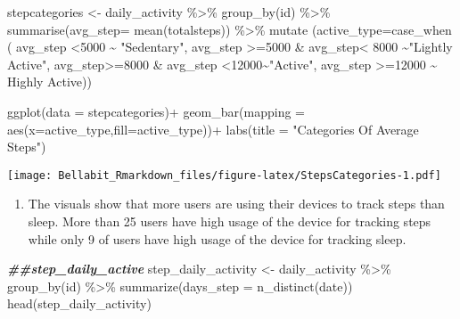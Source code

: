 \documentclass[
]{article}
\newenvironment{Shaded}{\begin{snugshade}}{\end{snugshade}}
\newcommand{\AttributeTok}[1]{\textcolor[rgb]{0.77,0.63,0.00}{#1}}
\newcommand{\DecValTok}[1]{\textcolor[rgb]{0.00,0.00,0.81}{#1}}
\newcommand{\DocumentationTok}[1]{\textcolor[rgb]{0.56,0.35,0.01}{\textbf{\textit{#1}}}}
\newcommand{\FunctionTok}[1]{\textcolor[rgb]{0.00,0.00,0.00}{#1}}
\newcommand{\NormalTok}[1]{#1}
\newcommand{\OtherTok}[1]{\textcolor[rgb]{0.56,0.35,0.01}{#1}}
\newcommand{\SpecialCharTok}[1]{\textcolor[rgb]{0.00,0.00,0.00}{#1}}
\newcommand{\StringTok}[1]{\textcolor[rgb]{0.31,0.60,0.02}{#1}}
\providecommand{\tightlist}{%
  \setlength{\itemsep}{0pt}\setlength{\parskip}{0pt}}
\begin{document}
\begin{Shaded}
\begin{Highlighting}[]
\NormalTok{stepcategories }\OtherTok{\textless{}{-}}\NormalTok{ daily\_activity }\SpecialCharTok{\%\textgreater{}\%} 
  \FunctionTok{group\_by}\NormalTok{(id) }\SpecialCharTok{\%\textgreater{}\%} 
  \FunctionTok{summarise}\NormalTok{(}\AttributeTok{avg\_step=} \FunctionTok{mean}\NormalTok{(totalsteps)) }\SpecialCharTok{\%\textgreater{}\%} 
  \FunctionTok{mutate}\NormalTok{ (}\AttributeTok{active\_type=}\FunctionTok{case\_when}\NormalTok{ (}
\NormalTok{    avg\_step }\SpecialCharTok{\textless{}}\DecValTok{5000} \SpecialCharTok{\textasciitilde{}} \StringTok{"Sedentary"}\NormalTok{,}
\NormalTok{    avg\_step }\SpecialCharTok{\textgreater{}=}\DecValTok{5000} \SpecialCharTok{\&}\NormalTok{ avg\_step}\SpecialCharTok{\textless{}} \DecValTok{8000} \SpecialCharTok{\textasciitilde{}}\StringTok{"Lightly Active"}\NormalTok{,}
\NormalTok{    avg\_step}\SpecialCharTok{\textgreater{}=}\DecValTok{8000} \SpecialCharTok{\&}\NormalTok{ avg\_step }\SpecialCharTok{\textless{}}\DecValTok{12000}\SpecialCharTok{\textasciitilde{}}\StringTok{"Active"}\NormalTok{,}
\NormalTok{    avg\_step }\SpecialCharTok{\textgreater{}=}\DecValTok{12000} \SpecialCharTok{\textasciitilde{}} \StringTok{\textquotesingle{}Highly Active\textquotesingle{}}\NormalTok{))}

\FunctionTok{ggplot}\NormalTok{(}\AttributeTok{data =}\NormalTok{ stepcategories)}\SpecialCharTok{+}
  \FunctionTok{geom\_bar}\NormalTok{(}\AttributeTok{mapping =} \FunctionTok{aes}\NormalTok{(}\AttributeTok{x=}\NormalTok{active\_type,}\AttributeTok{fill=}\NormalTok{active\_type))}\SpecialCharTok{+}
  \FunctionTok{labs}\NormalTok{(}\AttributeTok{title =} \StringTok{"Categories Of Average Steps"}\NormalTok{)}
\end{Highlighting}
\end{Shaded}

\texttt{[image: Bellabit\_Rmarkdown\_files/figure-latex/StepsCategories-1.pdf]}

\begin{enumerate}
\def\labelenumi{\arabic{enumi}.}
\setcounter{enumi}{1}
\tightlist
\item
  The visuals show that more users are using their devices to track
  steps than sleep. More than 25 users have high usage of the device for
  tracking steps while only 9 of users have high usage of the device for
  tracking sleep.
\end{enumerate}

\begin{Shaded}
\begin{Highlighting}[]
\DocumentationTok{\#\#step\_daily\_active}
\NormalTok{step\_daily\_activity }\OtherTok{\textless{}{-}}\NormalTok{ daily\_activity }\SpecialCharTok{\%\textgreater{}\%}
  \FunctionTok{group\_by}\NormalTok{(id) }\SpecialCharTok{\%\textgreater{}\%}
  \FunctionTok{summarize}\NormalTok{(}\AttributeTok{days\_step =} \FunctionTok{n\_distinct}\NormalTok{(date))}
\FunctionTok{head}\NormalTok{(step\_daily\_activity)}
\end{Highlighting}
\end{Shaded}
\end{document}
